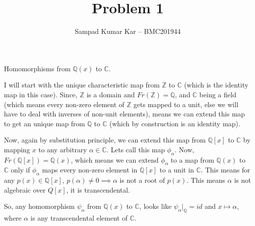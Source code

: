 \documentclass[12pt,a4paper]{article}
\title{Problem 1}
\author{Sampad Kumar Kar -- BMC201944}
\theoremstyle{definition}
\begin{document}
\maketitle

\begin{flushleft}

Homomorphisms from $\mathbb{Q}(x)$ to $\mathbb{C}$.

\medskip

I will start with the unique characteristic map from $\mathbb{Z}$ to $\mathbb{C}$ (which is the identity map in this case). Since, $\mathbb{Z}$ is a domain and $Fr(\mathbb{Z}) = \mathbb{Q}$, and $\mathbb{C}$ being a field (which means every non-zero element of $\mathbb{Z}$ gets mapped to a unit, else we will have to deal with inverses of non-unit elements), means we can extend this map to get an unique map from $\mathbb{Q}$ to $\mathbb{C}$ (which by construction is an identity map).

\medskip

Now, again by substitution principle, we can extend this map from $\mathbb{Q}[x]$ to $\mathbb{C}$ by mapping $x$ to any arbitrary $\alpha \in \mathbb{C}$. Lets call this map $\phi_{\alpha}$. Now, $Fr(\mathbb{Q}[x]) = \mathbb{Q}(x)$, which means we can extend $\phi_{\alpha}$ to a map from $\mathbb{Q}(x)$ to $\mathbb{C}$ only if $\phi_{\alpha}$ maps every non-zero element in $\mathbb{Q}[x]$ to a unit in $\mathbb{C}$. This means for any $p(x) \in \mathbb{Q}[x]$, $p(\alpha) \ne 0 \implies \alpha$ is not a root of $p(x)$. This means $\alpha$ is not algebraic over $Q[x]$, it is transcendental.

\medskip

So, any homomorphism $\psi_{\alpha}$ from $\mathbb{Q}(x)$ to $\mathbb{C}$, looks like $\psi_{\alpha} |_{\mathbb{Q}} = id$ and $x \mapsto \alpha$, where $\alpha$ is any transcendental element of $\mathbb{C}$.

\end{flushleft}
\end{document}
